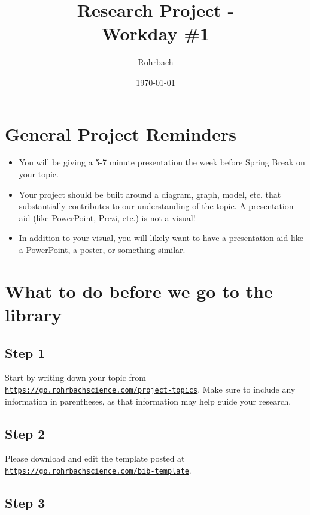 \documentclass[10pt]{exam}
\title{Research Project - \\Workday \#1}
\author{Rohrbach}
\date{\today}
\begin{document}
\maketitle

\section*{General Project Reminders}

\begin{itemize}
  \item 
    You will be giving a 5-7 minute presentation the week before Spring Break on your topic.
  \item	
    Your project should be built around a diagram, graph, model, etc. that substantially contributes to our understanding of the topic.  A presentation aid (like PowerPoint, Prezi, etc.) is not a visual!
  \item
    In addition to your visual, you will likely want to have a presentation aid like a PowerPoint, a poster, or something similar.
  
\end{itemize}

\section*{What to do before we go to the library}

\subsection*{Step 1}
Start by writing down your topic from \texttt{\href{https://go.rohrbachscience.com/project-topics}{https://go.rohrbachscience.com/project-topics}}.  Make sure to include any information in parentheses, as that information may help guide your research.

\begin{center}
  \fillin[][0.9\textwidth]
\end{center}

\subsection*{Step 2}

Please download and edit the template posted at \texttt{\href{https://go.rohrbachscience.com/bib-template}{https://go.rohrbachscience.com/bib-template}}.

\subsection*{Step 3}
\end{document}
